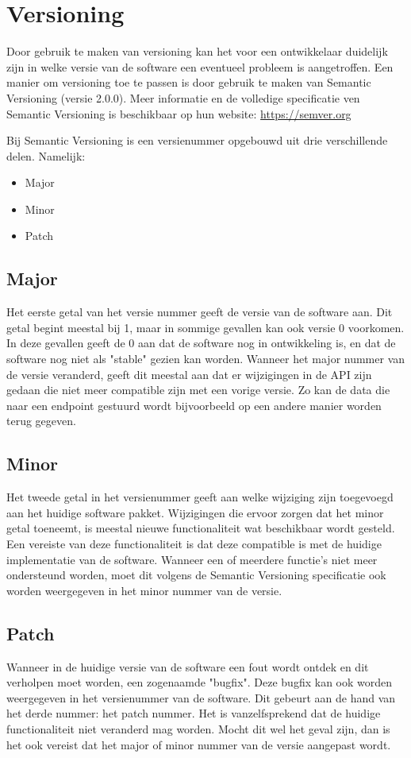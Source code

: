 \chapter{Versioning}
Door gebruik te maken van versioning kan het voor een ontwikkelaar duidelijk zijn in welke versie van de software een eventueel probleem is aangetroffen. 
Een manier om versioning toe te passen is door gebruik te maken van Semantic Versioning (versie 2.0.0).
Meer informatie en de volledige specificatie ven Semantic Versioning is beschikbaar op hun website: \url{https://semver.org}

Bij Semantic Versioning is een versienummer opgebouwd uit drie verschillende delen. Namelijk:
\begin{itemize}
	\item Major
	\item Minor
	\item Patch
\end{itemize}

\section{Major}
Het eerste getal van het versie nummer geeft de versie van de software aan. Dit getal begint meestal bij 1, maar in sommige gevallen kan ook versie 0 voorkomen. In deze gevallen geeft de 0 aan dat de software nog in ontwikkeling is, en dat de software nog niet als "stable" gezien kan worden.
Wanneer het major nummer van de versie veranderd, geeft dit meestal aan dat er wijzigingen in de API zijn gedaan die niet meer compatible zijn met een vorige versie. Zo kan de data die naar een endpoint gestuurd wordt bijvoorbeeld op een andere manier worden terug gegeven.

\section{Minor}
Het tweede getal in het versienummer geeft aan welke wijziging zijn toegevoegd aan het huidige software pakket. Wijzigingen die ervoor zorgen dat het minor getal toeneemt, is meestal nieuwe functionaliteit wat beschikbaar wordt gesteld. Een vereiste van deze functionaliteit is dat deze compatible is met de huidige implementatie van de software.
Wanneer een of meerdere functie's niet meer ondersteund worden, moet dit volgens de Semantic Versioning specificatie ook worden weergegeven in het minor nummer van de versie.

\section{Patch}
Wanneer in de huidige versie van de software een fout wordt ontdek en dit verholpen moet worden, een zogenaamde "bugfix". Deze bugfix kan ook worden weergegeven in het versienummer van de software. Dit gebeurt aan de hand van het derde nummer: het patch nummer. Het is vanzelfsprekend dat de huidige functionaliteit niet veranderd mag worden. Mocht dit wel het geval zijn, dan is het ook vereist dat het major of minor nummer van de versie aangepast wordt.

